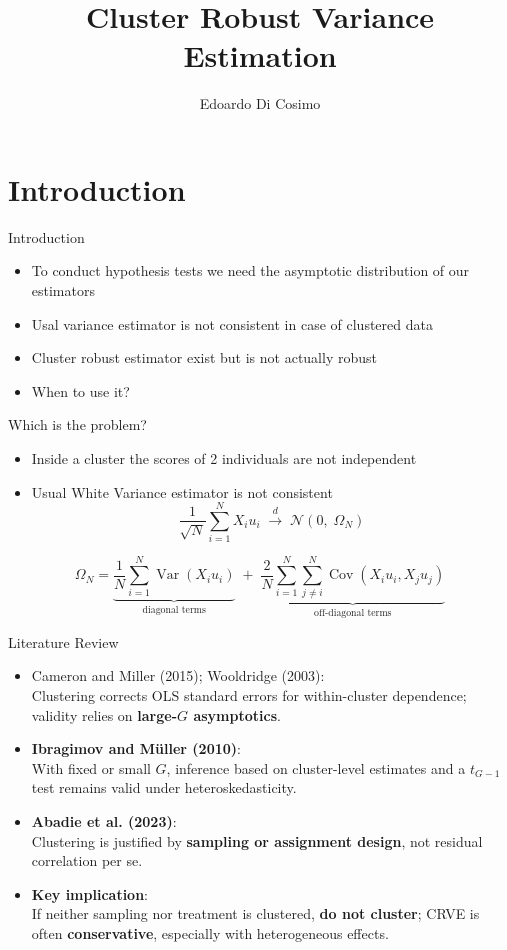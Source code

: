 \documentclass[
  ignorenonframetext,
]{beamer}
\title{Cluster Robust Variance Estimation}
\author{Edoardo Di Cosimo}
\date{}
\institute{Sapienza University of Rome}
\providecommand{\tightlist}{%
  \setlength{\itemsep}{0pt}\setlength{\parskip}{0pt}}
\begin{document}
\frame{\titlepage}


\section{Introduction}\label{introduction}

\begin{frame}{Introduction}
\label{introduction-1}
\begin{itemize}
\tightlist
\item
  To conduct hypothesis tests we need the asymptotic distribution of our
  estimators
\item
  Usal variance estimator is not consistent in case of clustered data
\item
  Cluster robust estimator exist but is not actually robust
\item
  When to use it?
\end{itemize}
\end{frame}

\begin{frame}{Which is the problem?}
\label{which-is-the-problem}
\begin{itemize}
\tightlist
\item
  Inside a cluster the scores of 2 individuals are not independent
\item
  Usual White Variance estimator is not consistent \[
  \frac{1}{\sqrt{N}} \sum_{i=1}^N X_i u_i
  \;\xrightarrow{d}\;
  \mathcal{N}\!\left(0,\;\Omega_N\right)
  \]
\end{itemize}

\[
\Omega_N
=
\underbrace{
\frac{1}{N} \sum_{i=1}^N \operatorname{Var}(X_i u_i)
}_{\text{diagonal terms}}
\;+\;
\underbrace{
\frac{2}{N} \sum_{i=1}^N \sum_{j\neq i}^N
\operatorname{Cov}(X_i u_i, X_j u_j)
}_{\text{off-diagonal terms}}
\]
\end{frame}

\begin{frame}{Literature Review}
\label{literature-review}
\begin{itemize}
\item
  Cameron and Miller (2015); Wooldridge (2003):\\
  Clustering corrects OLS standard errors for within-cluster dependence;
  validity relies on \textbf{large-\(G\) asymptotics}.
\item
  \textbf{Ibragimov and Müller (2010)}:\\
  With fixed or small \(G\), inference based on cluster-level estimates
  and a \(t_{G-1}\) test remains valid under heteroskedasticity.
\item
  \textbf{Abadie et al. (2023)}:\\
  Clustering is justified by \textbf{sampling or assignment design}, not
  residual correlation per se.
\item
  \textbf{Key implication}:\\
  If neither sampling nor treatment is clustered, \textbf{do not
  cluster}; CRVE is often \textbf{conservative}, especially with
  heterogeneous effects.
\end{itemize}
\end{frame}
\end{document}
